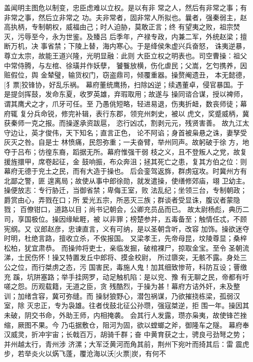 盖闻明主图危以制变，忠臣虑难以立权。是以有非
常之人，然后有非常之事；有非常之事，然后立非常之
功。夫非常者，固非常人所拟也。曩者，强秦弱主，赵
高执柄，专制朝权，威福由己；时人迫胁，莫敢正言；终
有望夷之败，祖宗焚灭，污辱至今，永为世鉴。及臻吕
后季年，产禄专政，内兼二军，外统赵梁；擅断万机，决
事省禁；下陵上替，海内寒心。于是绛侯朱虚兴兵奋怒，
诛夷逆暴，尊立太宗，故能王道兴隆，光明显融：此则
大臣立权之明表也。司空曹操：祖父中常侍腾，与左棺、徐璜并作妖孽，
饕餮放横，伤化虐民；父嵩，乞匄携养，因赃假位，舆
金辇璧，输货权门，窃盗鼎司，倾覆重器。操赘阉遗丑，
本无懿德，[犭票]狡锋协，好乱乐祸。
幕府董统鹰扬，扫除凶逆；续遇董卓，侵官暴国。于
是提剑挥鼓，发命东夏，收罗英雄，弃瑕取用；故遂与
操同谘合谋，授以裨师，谓其鹰犬之才，爪牙可任。至
乃愚佻短略，轻进易退，伤夷折衄，数丧师徒；幕府辄
复分兵命锐，修完补辑，表行东郡，领兖州刺史，被以
虎文，奖蹙威柄，冀获秦师一克之报。而操遂承资跋扈，
恣行凶忒，割剥元元，残贤害善。
故九江太守边让，英才俊伟，天下知名；直言正色，
论不阿谄；身首被枭悬之诛，妻孥受灰灭之咎。自是士
林愤痛，民怨弥重；一夫奋臂，举州同声。故躬破于徐
方，地夺于吕布；彷徨东裔，蹈据无所。幕府惟强干弱
枝之义，且不登叛人之党，故复援旌擐甲，席卷起征，金
鼓响振，布众奔沮；拯其死亡之患，复其方伯之位：则
幕府无德于兖土之民，而有大造于操也。
后会銮驾返旆，群虏寇攻。时冀州方有北鄙之警，匪
遑离局；故使从事中郎徐勋，就发遣操，使缮修郊庙，翊
卫幼主。操便放志：专行胁迁，当御省禁；卑侮王室，败
法乱纪；坐领三台，专制朝政；爵赏由心，弄戮在口；所
爱光五宗，所恶灭三族；群谈者受显诛，腹议者蒙隐戮；
百僚钳口，道路以目；尚书记朝会，公卿充员品而已。
故太尉杨彪，典历二司，享国极位。操因缘眦睚，被
以非罪；榜楚参并，五毒备至；触情任忒，不顾宪纲。又
议郎赵彦，忠谏直言，义有可纳，是以圣朝含听，改容
加饰。操欲迷夺时明，杜绝言路，擅收立杀，不俟报国。
又梁孝王，先帝母昆，坟陵尊显；桑梓松柏，犹宜肃恭。
而操帅将吏士，亲临发掘，破棺裸尸，掠取金宝。至令
圣朝流涕，士民伤怀！操又特置发丘中郎将、摸金校尉，
所过隳突，无骸不露。身处三公之位，而行桀虏之态，污
国害民，毒施人鬼！加其细致惨苛，科防互设；罾缴充
蹊，坑阱塞路；举手挂网罗，动足触机陷：是以兖、豫
有无聊之民，帝都有吁嗟之怨。历观载籍，无道之臣，贪
残酷烈，于操为甚！幕府方诘外奸，未及整训；加绪含容，冀可弥缝。而
操豺狼野心，潜包祸谋，乃欲摧挠栋梁，孤弱汉室，除
灭忠正，专为袅雄。往者伐鼓北征公孙瓒，强寇桀逆，拒
围一年。操因其未破，阴交书命，外助王师，内相掩袭。
会其行人发露，瓒亦枭夷，故使锋芒挫缩，厥图不果。今
乃屯据敷仓，阻河为固，欲以螳螂之斧，御隆车之隧。
幕府奉汉威灵，折冲宇宙；长戟百万，胡骑千群；奋
中黄育获之士，骋良弓劲弩之势；并州越太行，青州涉
济漯；大军泛黄河而角其前，荆州下宛叶而掎其后：雷
震虎步，若举炎火以焫飞蓬，覆沧海以沃[火票]炭，有何不
